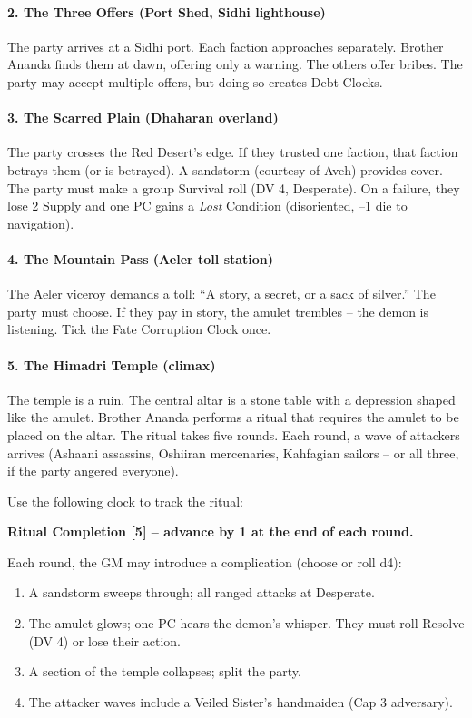 \documentclass[11pt]{book}
\begin{document}
\paragraph{2. The Three Offers (Port Shed, Sidhi lighthouse)}
The party arrives at a Sidhi port. Each faction approaches separately. Brother Ananda finds them at dawn, offering only a warning. The others offer bribes. The party may accept multiple offers, but doing so creates Debt Clocks.

\paragraph{3. The Scarred Plain (Dhaharan overland)}
The party crosses the Red Desert’s edge. If they trusted one faction, that faction betrays them (or is betrayed). A sandstorm (courtesy of Aveh) provides cover. The party must make a group Survival roll (DV 4, Desperate). On a failure, they lose 2 Supply and one PC gains a \textit{Lost} Condition (disoriented, –1 die to navigation).

\paragraph{4. The Mountain Pass (Aeler toll station)}
The Aeler viceroy demands a toll: “A story, a secret, or a sack of silver.” The party must choose. If they pay in story, the amulet trembles – the demon is listening. Tick the Fate Corruption Clock once.

\paragraph{5. The Himadri Temple (climax)}
The temple is a ruin. The central altar is a stone table with a depression shaped like the amulet. Brother Ananda performs a ritual that requires the amulet to be placed on the altar. The ritual takes five rounds. Each round, a wave of attackers arrives (Ashaani assassins, Oshiiran mercenaries, Kahfagian sailors – or all three, if the party angered everyone).

Use the following clock to track the ritual:
\begin{center}
\textbf{Ritual Completion [5] – advance by 1 at the end of each round.}
\end{center}
Each round, the GM may introduce a complication (choose or roll d4):
\begin{enumerate}
    \item A sandstorm sweeps through; all ranged attacks at Desperate.
    \item The amulet glows; one PC hears the demon’s whisper. They must roll Resolve (DV 4) or lose their action.
    \item A section of the temple collapses; split the party.
    \item The attacker waves include a Veiled Sister’s handmaiden (Cap 3 adversary).
\end{enumerate}
\end{document}
